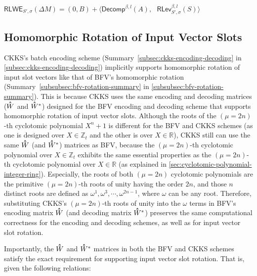 \begin{tcolorbox}[title={\textbf{\tboxlabel{\ref*{subsec:ckks-key-switching}} CKKS's Key Switching}}]
$\textsf{RLWE}_{S',\sigma}(\Delta M) = (0, B) + \bm{\langle} \textsf{Decomp}^{\beta, l}(A), \text{ } \textsf{RLev}_{S', \sigma}^{\beta, l}(S) \bm{\rangle}$
\end{tcolorbox}




\subsection{Homomorphic Rotation of Input Vector Slots}
\label{subsec:ckks-rotation}

CKKS's batch encoding scheme (Summary~\ref*{subsec:ckks-encoding-decoding} in \autoref{subsec:ckks-encoding-decoding}) implicitly supports homomorphic rotation of input slot vectors like that of BFV's homomorphic rotation (Summary~\ref*{subsubsec:bfv-rotation-summary} in \autoref{subsubsec:bfv-rotation-summary}). This is because CKKS uses the same encoding and decoding matrices ($\hathat W$ and $\hathat{W}^*$) designed for the BFV encoding and decoding scheme that supports homomorphic rotation of input vector slots. Although the roots of the $(\mu=2n)$-th cyclotomic polynomial $X^n + 1$ is different for the BFV and CKKS schemes (as one is designed over $X \in \mathbb{Z}_t$ and the other is over $X \in \mathbb{R}$), CKKS still can use the same $\hathat W$ (and $\hathat{W}^*$) matrices as BFV, because the $(\mu=2n)$-th cyclotomic polynomial over $X \in \mathbb{Z}_t$ exhibits the same essential properties as the $(\mu=2n)$-th cyclotomic polynomial over $X \in \mathbb{R}$ (as explained in \autoref{sec:cyclotomic-polynomial-integer-ring}). Especially, the roots of both $(\mu=2n)$ cyclotomic polynomials are the primitive $(\mu=2n)$-th roots of unity having the order $2n$, and those $n$ distinct roots are defined as $\omega^1, \omega^3, \cdots, \omega^{2n-1}$, where $\omega$ can be any root. Therefore, substituting CKKS's $(\mu=2n)$-th roots of unity into the $\omega$ terms in BFV's encoding matrix $\hathat{W}$ (and decoding matrix $\hathat{W}^*$) preserves the same computational correctness for the encoding and decoding schemes, as well as for input vector slot rotation. 

Importantly, the $\hathat{W}$ and $\hathat{W}^*$ matrices in both the BFV and CKKS schemes satisfy the exact requirement for supporting input vector slot rotation. That is, given the following relations:


